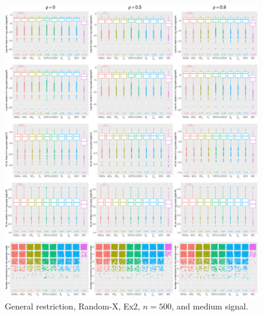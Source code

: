 \clearpage
\begin{figure}[!ht]
\centering
\includegraphics[width=\textwidth]{figures/supplement/randomx/general_restriction/Ex2_n500_msnr.eps}
\caption{General restriction, Random-X, Ex2, $n=500$, and medium signal.}
\end{figure}
\clearpage
